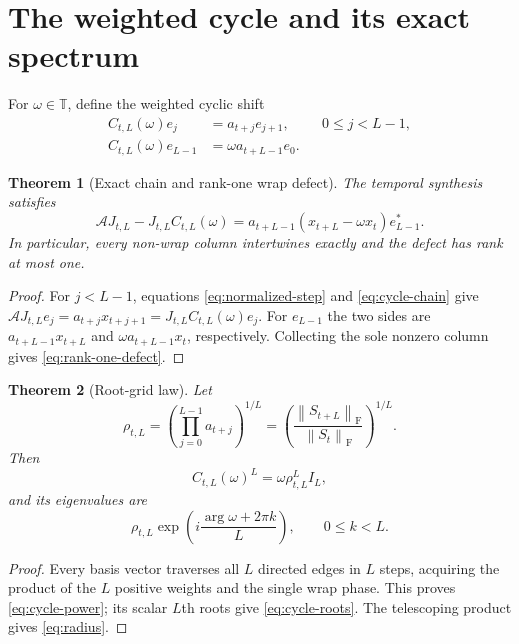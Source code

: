 \documentclass[12pt]{article}
\newtheorem{theorem}{Theorem}[section]
\theoremstyle{remark}
\newcommand{\norm}[1]{\left\lVert#1\right\rVert}
\newcommand{\F}{\mathrm F}
\begin{document}
\section{The weighted cycle and its exact spectrum}

For $\omega\in\mathbb T$, define the weighted cyclic shift
\begin{align}
 C_{t,L}(\omega)e_j&=a_{t+j}e_{j+1},&&0\le j<L-1,
 \label{eq:cycle-chain}\\
 C_{t,L}(\omega)e_{L-1}&=\omega a_{t+L-1}e_0.
 \label{eq:cycle-wrap}
\end{align}

\begin{theorem}[Exact chain and rank-one wrap defect]\label{thm:rank-one}
The temporal synthesis satisfies
\begin{equation}\label{eq:rank-one-defect}
 \mathcal A J_{t,L}-J_{t,L}C_{t,L}(\omega)
 =a_{t+L-1}(x_{t+L}-\omega x_t)e_{L-1}^*.
\end{equation}
In particular, every non-wrap column intertwines exactly and the defect has
rank at most one.
\end{theorem}

\begin{proof}
For $j<L-1$, equations \eqref{eq:normalized-step} and
\eqref{eq:cycle-chain} give
$\mathcal A J_{t,L}e_j=a_{t+j}x_{t+j+1}
=J_{t,L}C_{t,L}(\omega)e_j$.
For $e_{L-1}$ the two sides are
$a_{t+L-1}x_{t+L}$ and
$\omega a_{t+L-1}x_t$, respectively.  Collecting the sole nonzero column
gives \eqref{eq:rank-one-defect}.
\end{proof}

\begin{theorem}[Root-grid law]\label{thm:root-grid}
Let
\begin{equation}\label{eq:radius}
 \rho_{t,L}=
 \left(\prod_{j=0}^{L-1}a_{t+j}\right)^{1/L}
 =\left(\frac{\norm{S_{t+L}}_{\F}}{\norm{S_t}_{\F}}\right)^{1/L}.
\end{equation}
Then
\begin{equation}\label{eq:cycle-power}
 C_{t,L}(\omega)^L=\omega\rho_{t,L}^L I_L,
\end{equation}
and its eigenvalues are
\begin{equation}\label{eq:cycle-roots}
 \rho_{t,L}\exp\left(
 i\frac{\arg\omega+2\pi k}{L}
 \right),\qquad 0\le k<L.
\end{equation}
\end{theorem}

\begin{proof}
Every basis vector traverses all $L$ directed edges in $L$ steps, acquiring
the product of the $L$ positive weights and the single wrap phase.  This
proves \eqref{eq:cycle-power}; its scalar $L$th roots give
\eqref{eq:cycle-roots}.  The telescoping product gives \eqref{eq:radius}.
\end{proof}
\end{document}
